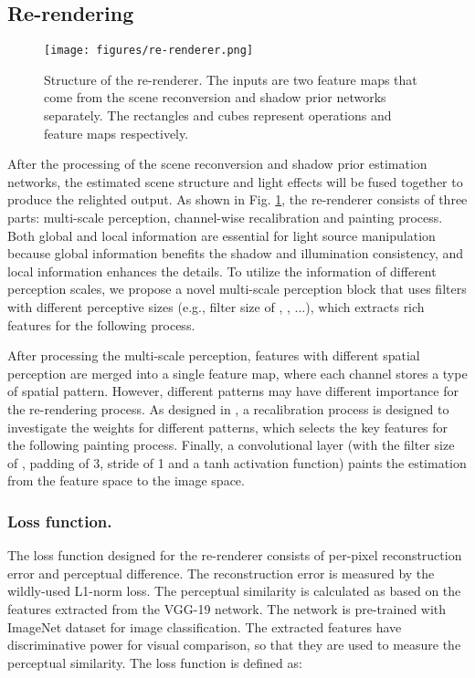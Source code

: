 \documentclass[runningheads]{llncs}
\begin{document}
\vskip -0.2cm
\baselineskip 
\subsection{Re-rendering}
\label{rerender}
\begin{figure}[t]
    \centering
    \texttt{[image: figures/re-renderer.png]}
   \baselineskip 
    \caption{Structure of the re-renderer. The inputs are two feature maps that come from the scene reconversion and shadow prior networks separately. The rectangles and cubes represent operations and feature maps respectively. 
}
    \label{fig:re-render}
   \baselineskip 
\end{figure}

After the processing of the scene reconversion and shadow prior estimation networks, the estimated scene structure and light effects will be fused together to produce the relighted output. As shown in Fig. \ref{fig:re-render}, the re-renderer consists of three parts: multi-scale perception, channel-wise recalibration and painting process. Both global and local information are essential for light source manipulation because global information benefits the shadow and illumination consistency, and local information enhances the details. To utilize the information of different perception scales, we propose a novel multi-scale perception block that uses filters with different perceptive sizes (e.g., filter size of , , ...), which extracts rich features for the following process. 

After processing the multi-scale perception, features with different spatial perception are merged into a single feature map, where each channel stores a type of spatial pattern. However, different patterns may have different importance for the re-rendering process. As designed in \cite{SE,DLN2020}, a recalibration process is designed to investigate the weights for different patterns, which selects the key features for the following painting process. Finally, a convolutional layer (with the filter size of , padding of 3, stride of 1 and a tanh activation function) paints the estimation from the feature space to the image space.
\vskip -0.5cm
\baselineskip 
\subsubsection{Loss function.} 
The loss function designed for the re-renderer consists of per-pixel reconstruction error and perceptual difference. The reconstruction error is measured by the wildly-used L1-norm loss. The perceptual similarity is calculated as \cite{VGG_loss} based on the features extracted from the VGG-19 network. The network is pre-trained with ImageNet dataset for image classification. The extracted features have discriminative power for visual comparison, so that they are used to measure the perceptual similarity. The loss function is defined as:
\end{document}
